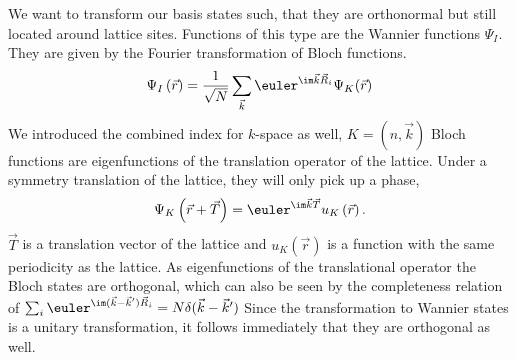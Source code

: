 \documentclass[a4paper,12pt]{report}
\begin{document}
We want to transform our basis states such, that they are orthonormal but still located around lattice sites.
Functions of this type are the Wannier functions $\Psi_I$. They are given by the Fourier transformation of Bloch functions.
\begin{equation}
 \Psi_I \left( \vec{r} \right) = \frac1{\sqrt{N}} \sum_{\vec{k}} \euler^{\im \vec{k}\vec{R}_i } \Psi_K(\vec r) 
\end{equation}
We introduced the combined index for $k$-space as well, $K=(n,\vec k)$
Bloch functions are eigenfunctions of the translation operator of the lattice. 
Under a symmetry translation of the lattice, they will only pick up a phase,
\begin{equation}
 \Psi_{K} \left( \vec{r}+\vec{T}\right) = \euler^{\im \vec{k} \vec{T} } u_{K} \left( \vec{r} \right). \label{BlochDef}
\end{equation}
$\vec T$ is a translation vector of the lattice and $u_{K} \left( \vec{r} \right)$ is a function with the same periodicity as the lattice. 
As eigenfunctions of the translational operator the Bloch states are orthogonal, 
which can also be seen by the completeness relation of $\sum_i \euler^{\im ( \vec k - \vec k^{\prime} ) \vec R_i} = N\delta (\vec k - \vec k^{\prime})$
Since the transformation to Wannier states is a unitary transformation, it follows immediately that they are orthogonal as well.
\end{document}
